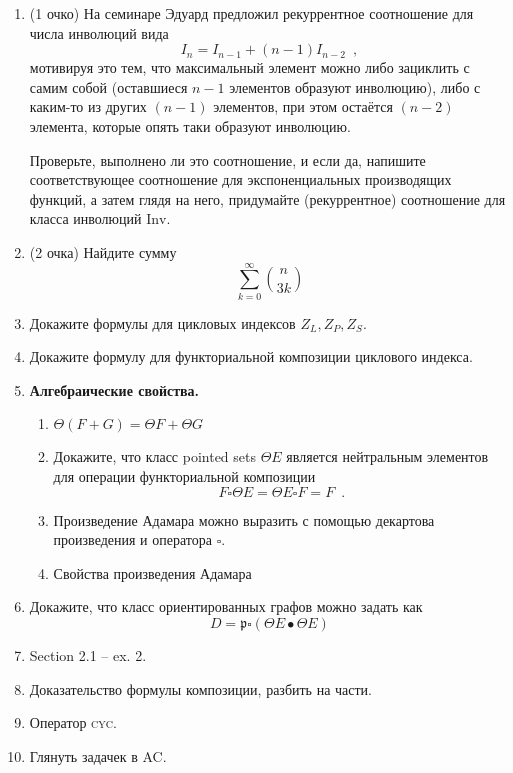 \documentclass{article}
\theoremstyle{definition}
\begin{document}
\begin{enumerate}
	\item(1 очко) На семинаре Эдуард предложил рекуррентное 
	соотношение для числа инволюций вида
	\[
		I_{n} = I_{n-1} + (n-1)I_{n-2} \enspace ,
	\]
	мотивируя это тем, 
	что 
	максимальный элемент можно либо зациклить с самим собой (оставшиеся \( n-1 
	\) 
	элементов образуют инволюцию), либо с каким-то из других \( (n-1) \) 
	элементов, 
	при этом остаётся \( (n-2) \) элемента, которые опять таки образуют 
	инволюцию.
	
	Проверьте, выполнено ли это соотношение, и если да, напишите 
	соответствующее 
	соотношение для экспоненциальных производящих функций, а затем глядя на 
	него, 
	придумайте (рекуррентное) соотношение для класса инволюций \( \mathrm{Inv} 
	\).
    \item(2 очка) Найдите сумму 
    \[
        \sum_{k = 0}^{\infty} {n \choose 3k}
    \]

	\item Докажите формулы для цикловых индексов \( Z_L, Z_P, Z_S \).
	\item Докажите формулу для функториальной композиции циклового индекса.
	\item \textbf{Алгебраические свойства.}
	\begin{enumerate}
	\item \( \Theta(F + G) = \Theta F + \Theta G \)
	\item	Докажите, что класс pointed sets \( \Theta E \) является 
	нейтральным элементов для операции функториальной композиции
	\[
		F \square \Theta E = \Theta E \square F = F \enspace .
	\]
	\item Произведение Адамара можно выразить с помощью декартова произведения 
	и оператора \( \square \).
	\item Свойства произведения Адамара
	\end{enumerate}
	\item Докажите, что класс ориентированных графов можно задать как 
	\[
		D = \mathfrak p \square (\Theta E \bullet \Theta E)
	\]
	\item Section 2.1 -- ex. 2. 
	\item Доказательство формулы композиции, разбить на части.
	\item Оператор \textsc{cyc}.
	\item Глянуть задачек в AC.
\end{enumerate}

\footnotesize


    
\end{document}
